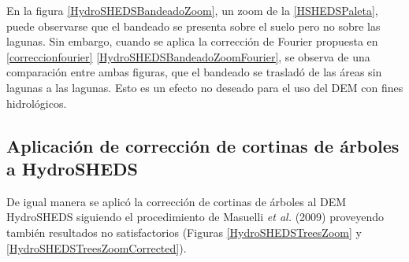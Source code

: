 \documentclass[10pt,a4paper, twoside]{report}
\begin{document}
En la figura \ref{HydroSHEDSBandeadoZoom}, un zoom de la \ref{HSHEDSPaleta}, puede observarse que el bandeado se presenta sobre el suelo pero no sobre las lagunas. Sin embargo, cuando se aplica la corrección de Fourier propuesta en \ref{correccionfourier} \ref{HydroSHEDSBandeadoZoomFourier}, se observa de una comparación entre ambas figuras, que el bandeado se trasladó de las áreas sin lagunas a las lagunas. Esto es un efecto no deseado para el uso del DEM con fines hidrológicos.

\subsection{Aplicación de corrección de cortinas de árboles a HydroSHEDS}

De igual manera se aplicó la corrección de cortinas de árboles al DEM HydroSHEDS siguiendo el procedimiento de Masuelli \textit{et al.} (2009) proveyendo también resultados no satisfactorios (Figuras \ref{HydroSHEDSTreesZoom} y \ref{HydroSHEDSTreesZoomCorrected}).
\end{document}
